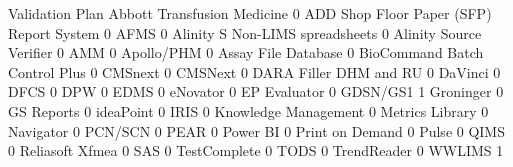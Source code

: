 \documentclass{article}
\begin{document}
\begin{Schunk}
\begin{Soutput}
                                           Validation Plan
  Abbott Transfusion Medicine                            0
  ADD Shop Floor Paper (SFP) Report System               0
  AFMS                                                   0
  Alinity S Non-LIMS spreadsheets                        0
  Alinity Source Verifier                                0
  AMM                                                    0
  Apollo/PHM                                             0
  Assay File Database                                    0
  BioCommand Batch Control Plus                          0
  CMSnext                                                0
  CMSNext                                                0
  DARA Filler DHM and RU                                 0
  DaVinci                                                0
  DFCS                                                   0
  DPW                                                    0
  EDMS                                                   0
  eNovator                                               0
  EP Evaluator                                           0
  GDSN/GS1                                               1
  Groninger                                              0
  GS Reports                                             0
  ideaPoint                                              0
  IRIS                                                   0
  Knowledge Management                                   0
  Metrics Library                                        0
  Navigator                                              0
  PCN/SCN                                                0
  PEAR                                                   0
  Power BI                                               0
  Print on Demand                                        0
  Pulse                                                  0
  QIMS                                                   0
  Reliasoft Xfmea                                        0
  SAS                                                    0
  TestComplete                                           0
  TODS                                                   0
  TrendReader                                            0
  WWLIMS                                                 1
\end{Soutput}
\end{Schunk}
\end{document}
